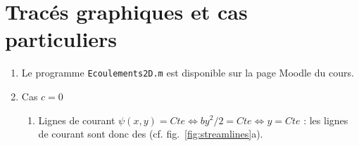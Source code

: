 \documentclass[10pt, a4paper]{article}
\begin{document}
\section{Tracés graphiques et cas particuliers}

\begin{enumerate}

\item




Le programme \texttt{Ecoulements2D.m} est 
disponible sur la page Moodle du cours.%
%
%	
%	
%	
%	
%	
%	
%	
%
\underline{\hspace{150mm}}

\bigskip


\item
Cas $c=0$
\medskip
\begin{enumerate}
\item
Lignes de courant $\psi(x, y) = Cte \Leftrightarrow b y^2/2 = Cte \Leftrightarrow y=Cte$ : les lignes de courant sont donc des
 (cf. fig.~\ref{fig:streamlines}a).


\end{enumerate}
\end{enumerate}
\end{document}
